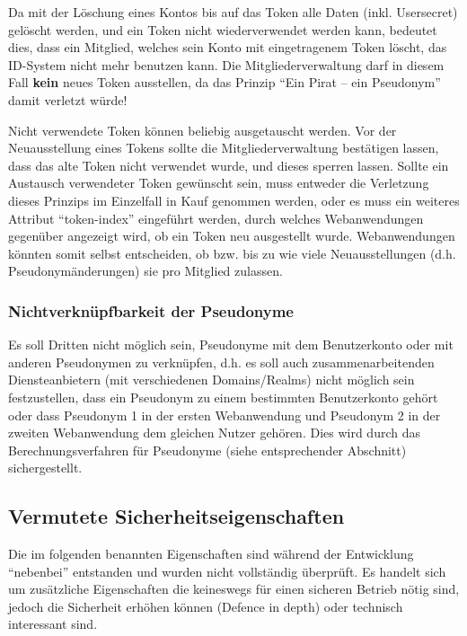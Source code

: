 Da mit der Löschung eines Kontos bis auf das Token alle Daten (inkl. Usersecret) gelöscht werden, und ein Token nicht wiederverwendet werden kann,
bedeutet dies, dass ein Mitglied, welches sein Konto mit eingetragenem Token löscht, das ID-System nicht mehr benutzen kann.
Die Mitgliederverwaltung darf in diesem Fall \textbf{kein} neues Token ausstellen, da das Prinzip "`Ein Pirat -- ein Pseudonym"' damit verletzt würde!

Nicht verwendete Token können beliebig ausgetauscht werden. Vor der Neuausstellung eines Tokens sollte die Mitgliederverwaltung bestätigen lassen,
dass das alte Token nicht verwendet wurde, und dieses sperren lassen.
Sollte ein Austausch verwendeter Token gewünscht sein, muss entweder die Verletzung dieses Prinzips im Einzelfall in Kauf genommen werden,
oder es muss ein weiteres Attribut "`token-index"' eingeführt werden, durch welches Webanwendungen gegenüber angezeigt wird, ob ein Token neu ausgestellt wurde.
Webanwendungen könnten somit selbst entscheiden, ob bzw. bis zu wie viele Neuausstellungen (d.h. Pseudonymänderungen) sie pro Mitglied zulassen.


\subsubsection{Nichtverknüpfbarkeit der Pseudonyme}
Es soll Dritten nicht möglich sein, Pseudonyme mit dem Benutzerkonto oder mit anderen Pseudonymen zu verknüpfen,
d.h. es soll auch zusammenarbeitenden Diensteanbietern (mit verschiedenen Domains/Realms) nicht möglich sein festzustellen, 
dass ein Pseudonym zu einem bestimmten Benutzerkonto gehört oder dass
Pseudonym 1 in der ersten Webanwendung und Pseudonym 2 in der zweiten Webanwendung dem gleichen Nutzer gehören.
Dies wird durch das Berechnungsverfahren für Pseudonyme (siehe entsprechender Abschnitt) sichergestellt.


\subsection{Vermutete Sicherheitseigenschaften}
Die im folgenden benannten Eigenschaften sind während der Entwicklung "`nebenbei"' entstanden und wurden nicht vollständig überprüft.
Es handelt sich um zusätzliche Eigenschaften die keineswegs für einen sicheren Betrieb nötig sind, jedoch die Sicherheit erhöhen können
(Defence in depth) oder technisch interessant sind.

